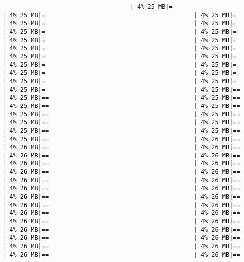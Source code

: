 \documentclass[
]{article}
\begin{document}
\begin{verbatim}
                                    | 4% 25 MB|=                                          | 4% 25 MB|=                                          | 4% 25 MB|=                                          | 4% 25 MB|=                                          | 4% 25 MB|=                                          | 4% 25 MB|=                                          | 4% 25 MB|=                                          | 4% 25 MB|=                                          | 4% 25 MB|=                                          | 4% 25 MB|=                                          | 4% 25 MB|=                                          | 4% 25 MB|=                                          | 4% 25 MB|=                                          | 4% 25 MB|=                                          | 4% 25 MB|=                                          | 4% 25 MB|=                                          | 4% 25 MB|=                                          | 4% 25 MB|=                                          | 4% 25 MB|=                                          | 4% 25 MB|=                                          | 4% 25 MB|==                                         | 4% 25 MB|==                                         | 4% 25 MB|==                                         | 4% 25 MB|==                                         | 4% 25 MB|==                                         | 4% 25 MB|==                                         | 4% 25 MB|==                                         | 4% 25 MB|==                                         | 4% 25 MB|==                                         | 4% 25 MB|==                                         | 4% 25 MB|==                                         | 4% 25 MB|==                                         | 4% 26 MB|==                                         | 4% 26 MB|==                                         | 4% 26 MB|==                                         | 4% 26 MB|==                                         | 4% 26 MB|==                                         | 4% 26 MB|==                                         | 4% 26 MB|==                                         | 4% 26 MB|==                                         | 4% 26 MB|==                                         | 4% 26 MB|==                                         | 4% 26 MB|==                                         | 4% 26 MB|==                                         | 4% 26 MB|==                                         | 4% 26 MB|==                                         | 4% 26 MB|==                                         | 4% 26 MB|==                                         | 4% 26 MB|==                                         | 4% 26 MB|==                                         | 4% 26 MB|==                                         | 4% 26 MB|==                                         | 4% 26 MB|==                                         | 4% 26 MB|==                                         | 4% 26 MB|==                                         | 4% 26 MB|==                                         | 4% 26 MB|==                                         | 4% 26 MB|==                                         | 4% 26 MB|==                                         | 4% 26 MB|==                                         | 4% 26 MB|==                              
\end{verbatim}
\end{document}
